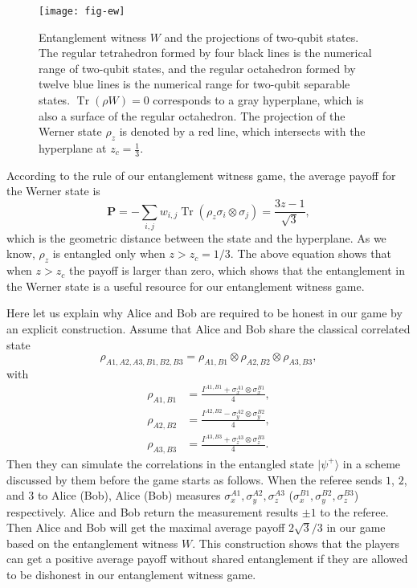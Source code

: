 \documentclass[twocolumn,pra,showpacs,superscriptaddress]{revtex4-1}
\DeclareMathOperator{\Tr}{Tr}
\begin{document}
\begin{figure}[htbp]
  \centering
  \texttt{[image: fig-ew]}
  \caption{Entanglement witness $W$ and the projections of two-qubit
    states. The regular tetrahedron formed by four black lines is the
    numerical range of two-qubit states,  and the regular octahedron
    formed by twelve blue lines is the numerical range for two-qubit
    separable states. $\Tr(\rho W)=0$ corresponds to a gray
    hyperplane, which is also a surface of the regular octahedron. The
    projection of the Werner state $\rho_{z}$ is denoted by a
    red line, which intersects with the hyperplane at $z_{c}=\frac{1}{3}$.  }
  \label{fig2}
\end{figure}




According to the rule of our entanglement witness game, the average payoff
for the Werner state is
\begin{equation}
 \textbf{P}=-\sum_{i,j}w_{i,j} \Tr(\rho_{z} \sigma_i\otimes\sigma_j)
 =\frac{3z-1}{ \sqrt{3}},
\end{equation}
which is  the geometric distance between the state and
the hyperplane. As we know, $\rho_z$ is entangled only when $z>z_{c}=1/3$.
The above equation shows that when $z>z_{c}$ the payoff is larger than
zero, which shows that the entanglement in the Werner state is a
useful resource for our entanglement witness game.


Here let us explain why Alice and Bob are required to be honest in our game by an explicit construction. Assume that Alice and Bob share
the classical correlated state
\begin{equation}
  \label{eq:10}
  \rho_{A1,A2,A3,B1,B2,B3}=\rho_{A1,B1}\otimes\rho_{A2,B2}\otimes\rho_{A3,B3},
\end{equation}
with
\begin{align}
  \rho_{A1,B1} & = \frac{I^{A1,B1} + \sigma_{x}^{A1}\otimes\sigma_{x}^{B1}}{4}, \\
  \rho_{A2,B2} & = \frac{I^{{A2,B2}} - \sigma_{y}^{A2}\otimes\sigma_{y}^{B2}}{4}, \\
  \rho_{A3,B3} & = \frac{I^{A3,B3} + \sigma_{z}^{A3}\otimes\sigma_{z}^{B3}}{4}.
\end{align}
Then they can simulate the correlations in the entangled state
$|\psi^{+}\rangle$ in a scheme discussed by them before the game
starts as follows. When the referee sends $1$, $2$, and $3$ to Alice
(Bob), Alice (Bob) measures
$\sigma_{x}^{A1}, \sigma_{y}^{A2}, \sigma_{z}^{A3}$
($\sigma_{x}^{B1}, \sigma_{y}^{B2}, \sigma_{z}^{B3}$)
respectively. Alice and Bob return the measurement results $\pm 1$ to
the referee. Then Alice and Bob will get the maximal average payoff
$2\sqrt{3}/3$ in our game based on the entanglement witness
$W$. This construction shows that the players can get a positive
average payoff without shared entanglement if they are allowed to be
dishonest in our entanglement witness game.
\end{document}
